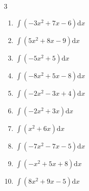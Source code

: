 \begin{multicols}{3}
\begin{enumerate}

\columnbreak %

  \item $\displaystyle \int \left( -3x^{2}+7x-6 \right) \mathrm{d}x$


  \item $\displaystyle \int \left( 5x^{2}+8x-9 \right) \mathrm{d}x$


  \item $\displaystyle \int \left( -5x^{2}+5 \right) \mathrm{d}x$


  \item $\displaystyle \int \left( -8x^{2}+5x-8 \right) \mathrm{d}x$


  \item $\displaystyle \int \left( -2x^{2}-3x+4 \right) \mathrm{d}x$


  \item $\displaystyle \int \left( -2x^{2}+3x \right) \mathrm{d}x$


  \item $\displaystyle \int \left( x^{2}+6x \right) \mathrm{d}x$


  \item $\displaystyle \int \left( -7x^{2}-7x-5 \right) \mathrm{d}x$


  \item $\displaystyle \int \left( -x^{2}+5x+8 \right) \mathrm{d}x$


  \item $\displaystyle \int \left( 8x^{2}+9x-5 \right) \mathrm{d}x$


\end{enumerate}
\end{multicols}
